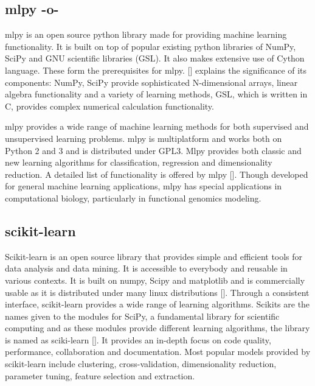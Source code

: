 \subsection{mlpy -o-}
    
mlpy is an open source python library made for providing machine
learning functionality. It is built on top of popular existing python
libraries of NumPy, SciPy and GNU scientific libraries (GSL). It also
makes extensive use of Cython language. These form the prerequisites
for mlpy. [\cite{DBLP:journals/corr/abs-1202-6548}] explains the
significance of its components: NumPy, SciPy provide sophisticated
N-dimensional arrays, linear algebra functionality and a variety of
learning methods, GSL, which is written in C, provides complex
numerical calculation functionality.

mlpy provides a wide range of machine learning methods for both
supervised and unsupervised learning problems. mlpy is multiplatform
and works both on Python 2 and 3 and is distributed under GPL3. Mlpy
provides both classic and new learning algorithms for classification,
regression and dimensionality reduction. A detailed list of
functionality is offered by mlpy [\cite{www-mlpy}]. Though developed for
general machine learning applications, mlpy has special applications
in computational biology, particularly in functional genomics
modeling.



\subsection{scikit-learn}

Scikit-learn is an open source library that provides simple and
efficient tools for data analysis and data mining. It is accessible to
everybody and reusable in various contexts. It is built on numpy,
Scipy and matplotlib and is commercially usable as it is distributed
under many linux distributions [\cite{scik1}]. Through a consistent
interface, scikit-learn provides a wide range of learning
algorithms. Scikits are the names given to the modules for SciPy, a
fundamental library for scientific computing and as these modules
provide different learning algorithms, the library is named as
sciki-learn [\cite{scik2}]. It provides an in-depth focus on code
quality, performance, collaboration and documentation. Most popular
models provided by scikit-learn include clustering, cross-validation,
dimensionality reduction, parameter tuning, feature selection and
extraction.

